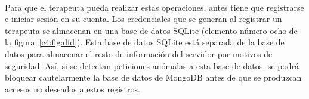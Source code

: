 \paragraph{}
Para que el terapeuta pueda realizar estas operaciones, antes tiene que registrarse e iniciar sesión en su cuenta. Los credenciales que se generan al registrar un terapeuta se almacenan en una base de datos SQLite (elemento número ocho de la figura~\ref{c4:fig:dfd}). Esta base de datos SQLite está separada de la base de datos para almacenar el resto de información del servidor por motivos de seguridad. Así, si se detectan peticiones anómalas a esta base de datos, se podrá bloquear cautelarmente la base de datos de MongoDB antes de que se produzcan accesos no deseados a estos registros.
